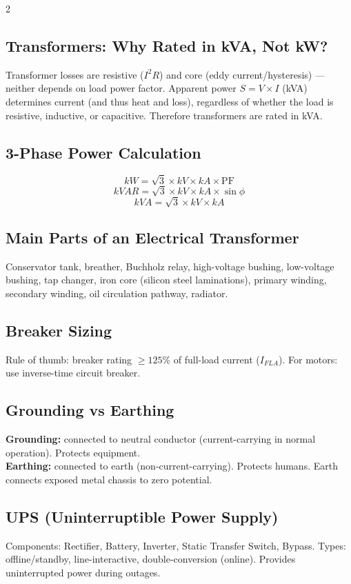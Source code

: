 \documentclass[10pt,a4paper]{article}
\begin{document}
\begin{multicols}{2}
\subsection{Transformers: Why Rated in kVA, Not kW?}
Transformer losses are resistive ($I^2R$) and core (eddy current/hysteresis) --- neither depends on load power factor. Apparent power $S = V \times I$ (kVA) determines current (and thus heat and loss), regardless of whether the load is resistive, inductive, or capacitive. Therefore transformers are rated in kVA.

\subsection{3-Phase Power Calculation}
\[
kW = \sqrt{3} \times kV \times kA \times \text{PF}
\]
\[
kVAR = \sqrt{3} \times kV \times kA \times \sin\phi
\]
\[
kVA = \sqrt{3} \times kV \times kA
\]

\subsection{Main Parts of an Electrical Transformer}
Conservator tank, breather, Buchholz relay, high-voltage bushing, low-voltage bushing, tap changer, iron core (silicon steel laminations), primary winding, secondary winding, oil circulation pathway, radiator.

\subsection{Breaker Sizing}
Rule of thumb: breaker rating $\geq 125\%$ of full-load current ($I_{FLA}$). For motors: use inverse-time circuit breaker.

\subsection{Grounding vs Earthing}
\textbf{Grounding:} connected to neutral conductor (current-carrying in normal operation). Protects equipment.\\
\textbf{Earthing:} connected to earth (non-current-carrying). Protects humans. Earth connects exposed metal chassis to zero potential.

\subsection{UPS (Uninterruptible Power Supply)}
Components: Rectifier, Battery, Inverter, Static Transfer Switch, Bypass. Types: offline/standby, line-interactive, double-conversion (online). Provides uninterrupted power during outages.


\end{multicols}
\end{document}
